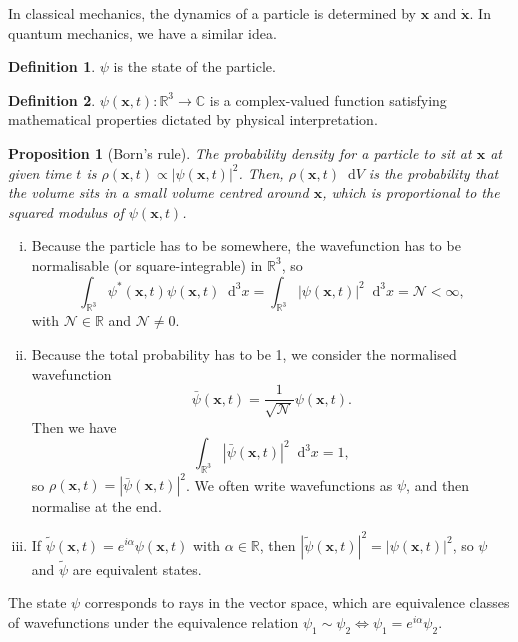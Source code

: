 \documentclass[12pt]{article}
\newcommand{\diff}{\mathop{}\!\mathrm{d}}
\newcommand{\Diff}[1]{\mathop{}\!\mathrm{d}^{#1}}
\newtheorem{proposition}{Proposition}[section]
\theoremstyle{definition}
\newtheorem{definition}{Definition}[section]
\theoremstyle{remark}
\begin{document}
In classical mechanics, the dynamics of a particle is determined by $\mathbf{x}$ and $\mathbf{\dot x}$. In quantum mechanics, we have a similar idea.

\begin{definition}
	$\psi$ is the state of the particle.
\end{definition}

\begin{definition}
	$\psi(\mathbf{x}, t) : \mathbb{R}^3 \to \mathbb{C}$ is a complex-valued function satisfying mathematical properties dictated by physical interpretation.
\end{definition}

\begin{proposition}[Born's rule]
	The probability density for a particle to sit at $\mathbf{x}$ at given time $t$ is $\rho(\mathbf{x}, t) \propto |\psi(\mathbf{x}, t)|^2$. Then, $\rho(\mathbf{x}, t)\diff V$ is the probability that the volume sits in a small volume centred around $\mathbf{x}$, which is proportional to the squared modulus of $\psi(\mathbf{x}, t)$.
\end{proposition}

\begin{enumerate}[(i)]
	\item Because the particle has to be somewhere, the wavefunction has to be normalisable (or square-integrable) in $\mathbb{R}^3$, so
		\[
			\int_{\mathbb{R}^3} \psi^{\ast}(\mathbf{x}, t) \psi(\mathbf{x}, t)\Diff3 x = \int_{\mathbb{R}^3} |\psi(\mathbf{x}, t)|^2\Diff3 x = \mathcal{N} < \infty
		,\]
		with $\mathcal{N} \in \mathbb{R}$ and $\mathcal{N} \neq 0$.
	\item Because the total probability has to be 1, we consider the normalised wavefunction
		\[
			\bar \psi(\mathbf{x}, t) = \frac{1}{\sqrt{\mathcal{N}}} \psi(\mathbf{x}, t)
		.\]
		Then we have
		\[
			\int_{\mathbb{R}^3}|\bar \psi (\mathbf{x}, t)|^2\Diff3 x = 1
		,\]
		so $\rho(\mathbf{x}, t) = |\bar \psi(\mathbf{x}, t)|^2$. We often write wavefunctions as $\psi$, and then normalise at the end.
	\item If $\tilde \psi (\mathbf{x}, t) = e^{i\alpha} \psi (\mathbf{x}, t)$ with $\alpha \in \mathbb{R}$, then $|\tilde \psi(\mathbf{x}, t)|^2 = |\psi(\mathbf{x}, t)|^2$, so $\psi$ and $\tilde \psi$ are equivalent states.
\end{enumerate}

The state $\psi$ corresponds to rays in the vector space, which are equivalence classes of wavefunctions under the equivalence relation $\psi_1 \sim \psi_2 \iff \psi_1 = e^{i \alpha}\psi_2$.
\end{document}
